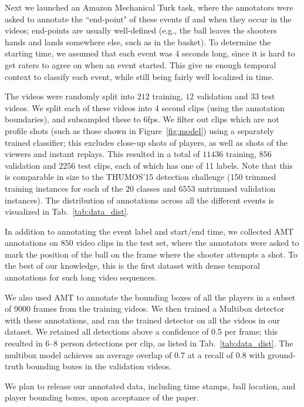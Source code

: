 Next we launched an Amazon Mechanical Turk task, where the
annotators were asked to annotate the ``end-point" of these events if and when
they occur in the videos; end-points are usually well-defined (e.g.,
the ball leaves the shooters hands and lands somewhere else, such as
in the basket).
To determine the starting time, we assumed that each event was 4
seconds long, since it is hard to get raters to agree on when an event
started. 
This give us enough temporal context to classify each event, while
still being fairly well localized in time.


The videos were randomly split into $212$ training, $12$ validation and $33$
test videos. 
We split each of these videos into 4 second clips (using the
annotation boundaries), and subsampled these to 6fps.
We filter out clips which are not profile shots (such as those shown in
Figure~\ref{fig:model}) using a separately trained classifier; this excludes close-up shots of players,  as
well as shots of the viewers and instant replays.
This resulted in a total of $11436$ training, $856$ validation
and $2256$ test clips, each of which has one of 11 labels.
Note that this is comparable in size to the THUMOS'15 detection
challenge (150 trimmed training instances for each of the $20$ classes and $6553$
untrimmed validation instances). The distribution of annotations across all the
different events is visualized in Tab.~\ref{tab:data_dist}.


In addition to annotating the event label and start/end time,
we collected AMT annotations on $850$ video clips in the test
set, where the annotators were asked to mark the position of the ball
on the frame where the shooter attempts a shot.
To the best of our
knowledge, this is the first dataset with dense temporal annotations for
such long video sequences.

We also used AMT to annotate the bounding boxes of all the players in a
subset of 9000 frames from the training videos.
We then trained a Multibox detector \cite{Szegedy_arxiv14}
with these annotations, and ran the trained detector on all the videos in our dataset.
We retained all detections above a confidence of 0.5 per frame;
this resulted in 6--8 person detections per clip, as listed in Tab.~\ref{tab:data_dist}.
The multibox model achieves an average overlap of $0.7$ at a recall of $0.8$
with ground-truth bounding boxes in the validation videos.

We plan to release our annotated data, including time stamps, ball
location, and player bounding boxes, upon acceptance of the paper.
